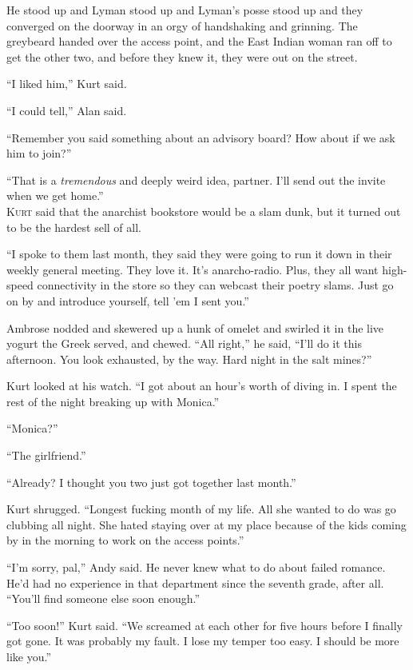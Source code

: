 He stood up and Lyman stood up and Lyman's posse stood up and they
converged on the doorway in an orgy of handshaking and grinning.  The
greybeard handed over the access point, and the East Indian woman ran
off to get the other two, and before they knew it, they were out on
the street.

``I liked him,'' Kurt said.

``I could tell,'' Alan said.

``Remember you said something about an advisory board?  How about if
we ask him to join?''

``That is a \textit{tremendous} and deeply weird idea, partner.  I'll
send out the invite when we get home.''
\\
\lettrine[lines=3, lhang=.5, nindent=0pt, findent=2pt]{K}{urt} said that the anarchist bookstore would be a slam dunk, but it
turned out to be the hardest sell of all.

``I spoke to them last month, they said they were going to run it down
in their weekly general meeting.  They love it.  It's anarcho-radio. 
Plus, they all want high-speed connectivity in the store so they can
webcast their poetry slams.  Just go on by and introduce yourself,
tell 'em I sent you.''

Ambrose nodded and skewered up a hunk of omelet and swirled it in the
live yogurt the Greek served, and chewed.  ``All right,'' he said,
``I'll do it this afternoon.  You look exhausted, by the way.  Hard
night in the salt mines?''

Kurt looked at his watch.  ``I got about an hour's worth of diving in. 
I spent the rest of the night breaking up with Monica.''

``Monica?''

``The girlfriend.''

``Already?  I thought you two just got together last month.''

Kurt shrugged.  ``Longest fucking month of my life.  All she wanted to
do was go clubbing all night.  She hated staying over at my place
because of the kids coming by in the morning to work on the access
points.''

``I'm sorry, pal,'' Andy said.  He never knew what to do about failed
romance.  He'd had no experience in that department since the seventh
grade, after all.  ``You'll find someone else soon enough.''

``Too soon!'' Kurt said.  ``We screamed at each other for five hours
before I finally got gone.  It was probably my fault.  I lose my
temper too easy.  I should be more like you.''

